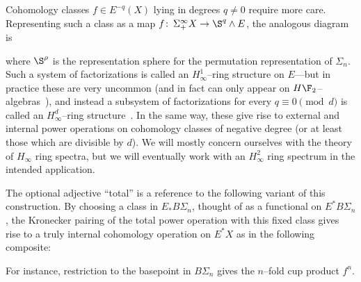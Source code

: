 Cohomology classes $f \in E^{-q}(X)$ lying in degrees $q \ne 0$ require more care.  Representing such a class as a map $f\co \Susp^\infty_+ X \to \S^q \sm E$, the analogous diagram is
\begin{center}
\end{center}
where $\S^\rho$ is the representation sphere for the permutation representation of $\Sigma_n$.  Such a system of factorizations is called an $H_\infty^1$--ring structure on $E$---but in practice these are very uncommon (and in fact can only appear on $H\F_2$--algebras~\cite[Section VII.6.1]{BMMS}), and instead a subsystem of factorizations for every $q \equiv 0 \pmod d$ is called an $H_\infty^d$--ring structure~\cite[Definition I.4.3]{BMMS}.  In the same way, these give rise to external and internal power operations on cohomology classes of negative degree (or at least those which are divisible by $d$).  We will mostly concern ourselves with the theory of $H_\infty$ ring spectra, but we will eventually work with an $H_\infty^2$ ring spectrum in the intended application.

\begin{remark}\label{RestrictingSteenrodOpToBasepoint}
The optional adjective ``total'' is a reference to the following variant of this construction.  By choosing a class in $E_* B\Sigma_n$, thought of as a functional on $E^* B\Sigma_n$, the Kronecker pairing of the total power operation with this fixed class gives rise to a truly internal cohomology operation on $E^* X$ as in the following composite:
\begin{center}
\end{center}
For instance, restriction to the basepoint in $B\Sigma_n$ gives the $n$--fold cup product $f^{n}$.
\end{remark}

